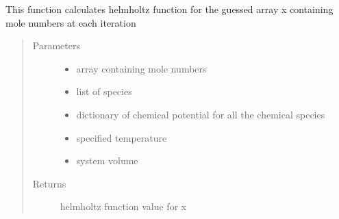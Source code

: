 \documentclass[letterpaper,10pt,english]{sphinxmanual}
\begin{document}
\begin{fulllineitems}
This function calculates helmholtz function for the guessed array x containing mole numbers at each iteration
\begin{quote}\begin{description}
\item[{Parameters}] \leavevmode\begin{itemize}
\item {} 
 \textendash{} array containing mole numbers

\item {} 
 \textendash{} list of species

\item {} 
 \textendash{} dictionary of chemical potential for all the chemical species

\item {} 
 \textendash{} specified temperature

\item {} 
 \textendash{} system volume

\end{itemize}

\item[{Returns}] \leavevmode
helmholtz function value for x

\end{description}\end{quote}

\end{fulllineitems}
\end{document}
